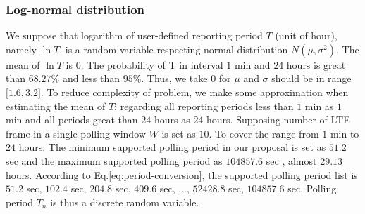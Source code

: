 \subsubsection{Log-normal distribution}
We suppose that logarithm of  user-defined reporting period $T$ (unit of hour), namely $\ln T$,  is a random variable respecting normal distribution $N (\mu, \sigma^2)$. The mean of $\ln T$ is $0$. The probability of T in interval $1$ min and $24$ hours is great than $68.27 \%$ and less than $95\%$. Thus, 
we take $0$ for $\mu$ and $\sigma$ should be in range $\lbrack1.6, 3.2\rbrack$. To reduce complexity of problem, we make some approximation when estimating the mean of $T$: regarding all reporting periods less than $1$ min as $1$ min and all periods great than $24$ hours as $24$ hours. 
Supposing number of LTE frame in a single polling window $W$ is set as $10$. To cover the range from $1$ min to $24$ hours. The minimum supported polling period in our proposal is set as $51.2$ sec and the maximum supported polling period as $104857.6$ sec , almost $29.13$ hours. According to Eq.\ref{eq:period-conversion}, the supported polling period list is $51.2$ sec, $102.4$ sec, $204.8$ sec, $409.6$ sec, ..., $52428.8$ sec, $104857.6$ sec. Polling period $T_n$ is thus a discrete random variable.
